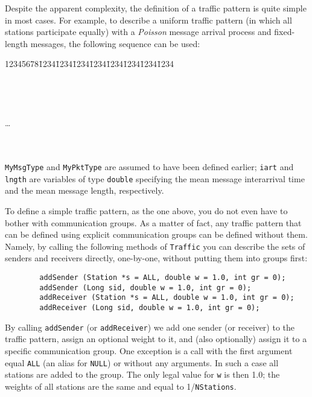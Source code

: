 \noindent
Despite the apparent complexity, the definition of a traffic pattern is quite
simple in most cases.
For example, to describe a uniform traffic pattern (in which all stations
participate equally) with a {\em Poisson\/} message arrival process and
fixed-length messages, the following sequence can be used:
{\tt\begin{tabbing}
12345678\=1234\=1234\=1234\=1234\=1234\=1234\=1234\=1234\kill
{}\\
\>{\tt \};}\\
\\
\\
\\
\> \ldots \\
\\
\\
\end{tabbing}}
\noindent
{\tt MyMsgType} and {\tt MyPktType} are assumed to have been defined earlier;
{\tt iart} and {\tt lngth} are variables of type {\tt double} specifying
the mean message interarrival time and the mean message length,
respectively.

\medskip

\noindent
To define a simple traffic pattern, as the one above, you do not even
have to bother with communication groups.
As a matter of fact, any traffic pattern that can be defined using explicit
communication groups can be defined without them.
Namely, by calling the following methods of {\tt Traffic} you can
describe the sets of senders and receivers directly, one-by-one,
without putting them into groups first:
\begin{verbatim}
        addSender (Station *s = ALL, double w = 1.0, int gr = 0);
        addSender (Long sid, double w = 1.0, int gr = 0);
        addReceiver (Station *s = ALL, double w = 1.0, int gr = 0);
        addReceiver (Long sid, double w = 1.0, int gr = 0);
\end{verbatim}

By calling {\tt addSender} (or {\tt addReceiver}) we add one sender
(or receiver)
to the traffic pattern, assign an optional weight to it, and (also
optionally) assign it to a specific communication group.
One exception is a call with the first argument equal {\tt ALL} (an alias for
{\tt NULL}) or without any arguments.
In such a case all stations are added to the group.
The only legal value for {\tt w} is then 1.0; the weights of all stations
are the same and equal to 1/{\tt NStations}.

